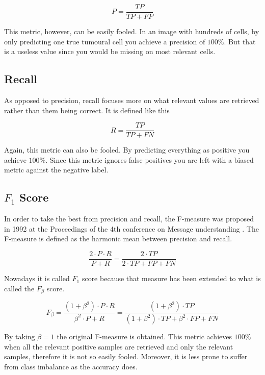 \begin{equation}
    P = \frac{TP}{TP + FP}
\end{equation}

This metric, however, can be easily fooled. In an image with hundreds of cells, by only predicting one true tumoural cell you achieve a precision of $100\%$. But that is a useless value since you would be missing on most relevant cells.

\subsection{Recall}

As opposed to precision, recall focuses more on what relevant values are retrieved rather than them being correct. It is defined like this

\begin{equation}
    R = \frac{TP}{TP + FN}
\end{equation}

Again, this metric can also be fooled. By predicting everything as positive you achieve $100\%$. Since this metric ignores false positives you are left with a biased metric against the negative label.

\subsection{$F_1$ Score}\label{sec:f1}

In order to take the best from precision and recall, the F-measure was proposed in 1992 at the Proceedings of the 4th conference on Message understanding \cite{10.5555/1072064}. The F-measure is defined as the harmonic mean between precision and recall.

\begin{equation}
    \frac{2 \cdot P \cdot R}{P + R} = \frac{2 \cdot TP}{2 \cdot TP + FP + FN}
\end{equation}

Nowadays it is called $F_1$ score because that measure has been extended to what is called the $F_\beta$ score.

\begin{equation}
    F_\beta = \frac{(1+\beta^2) \cdot P \cdot R}{\beta^2 \cdot P + R} = \frac{(1+\beta^2) \cdot TP}{(1+\beta^2) \cdot TP + \beta^2 \cdot FP + FN}
\end{equation}

\noindent By taking $\beta=1$ the original F-measure is obtained. This metric achieves $100\%$ when all the relevant positive samples are retrieved and only the relevant samples, therefore it is not so easily fooled. Moreover, it is less prone to suffer from class imbalance as the accuracy does.

